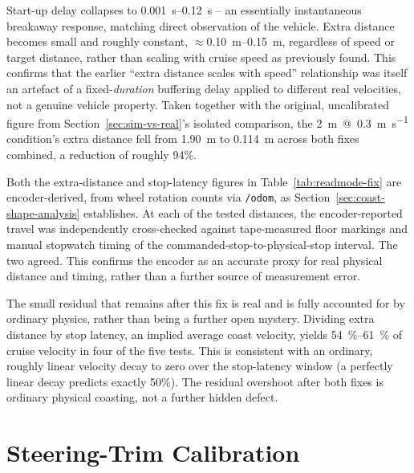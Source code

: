 Start-up delay collapses to \SIrange{0.001}{0.12}{\second} -- an
essentially instantaneous breakaway response, matching direct
observation of the vehicle. Extra distance becomes small and roughly
constant, $\approx$\SIrange{0.10}{0.15}{\meter}, regardless of speed
or target distance, rather than scaling with cruise speed as
previously found. This confirms that the earlier ``extra distance
scales with speed'' relationship was itself an artefact of a
fixed-\emph{duration} buffering delay applied to different real
velocities, not a genuine vehicle property. Taken together with the
original, uncalibrated figure from Section~\ref{sec:sim-vs-real}'s
isolated comparison, the \SI{2}{\meter}~@~\SI{0.3}{\meter\per\second}
condition's extra distance fell from \SI{1.90}{\meter} to
\SI{0.114}{\meter} across both fixes combined, a reduction of
roughly 94\%.

Both the extra-distance and stop-latency figures in
Table~\ref{tab:readmode-fix} are encoder-derived, from wheel rotation
counts via \texttt{/odom}, as Section~\ref{sec:coast-shape-analysis}
establishes. At each of the tested distances, the encoder-reported
travel was independently cross-checked against tape-measured floor
markings and manual stopwatch timing of the commanded-stop-to-physical-stop
interval. The two agreed. This confirms the encoder as an
accurate proxy for real physical distance and timing, rather than a
further source of measurement error.

The small residual that remains after this fix is real and is fully
accounted for by ordinary physics, rather than being a further open
mystery. Dividing extra distance by stop latency, an implied average
coast velocity, yields \SIrange{54}{61}{\percent} of cruise velocity
in four of the five tests. This is consistent with an ordinary,
roughly linear velocity decay to zero over the stop-latency window (a
perfectly linear decay predicts exactly 50\%). The residual overshoot
after both fixes is ordinary physical coasting, not a further hidden
defect.

\section{Steering-Trim Calibration}
\label{sec:steering-trim}

